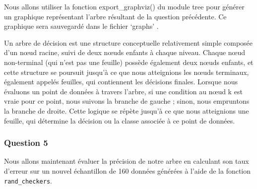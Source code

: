 \documentclass[
  letterpaper,
  DIV=11,
  numbers=noendperiod]{scrartcl}
\begin{document}
Nous allons utiliser la fonction export\_graphviz() du module tree pour
générer un graphique représentant l'arbre résultant de la question
précédente. Ce graphique sera sauvegardé dans le fichier `graphs' .

Un arbre de décision est une structure conceptuelle relativement simple
composée d'un nœud racine, suivi de deux nœuds enfants à chaque niveau.
Chaque nœud non-terminal (qui n'est pas une feuille) possède également
deux nœuds enfants, et cette structure se poursuit jusqu'à ce que nous
atteignions les nœuds terminaux, également appelés feuilles, qui
contiennent les décisions finales. Lorsque nous évaluons un point de
données à travers l'arbre, si une condition au nœud k est vraie pour ce
point, nous suivons la branche de gauche ; sinon, nous empruntons la
branche de droite. Cette logique se répète jusqu'à ce que nous
atteignions une feuille, qui détermine la décision ou la classe associée
à ce point de données.

\hypertarget{question-5}{%
\subsubsection{\texorpdfstring{Question 5
}{Question 5 }}\label{question-5}}

Nous allons maintenant évaluer la précision de notre arbre en calculant
son taux d'erreur sur un nouvel échantillon de 160 données générées à
l'aide de la fonction \texttt{rand\_checkers}.
\end{document}
